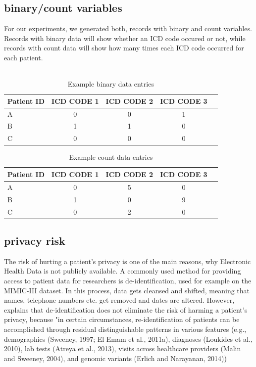 \documentclass[11pt, a4paper]{book}
\begin{document}
\subsection{binary/count variables}
For our experiments, we generated both, records with binary and count variables. Records with binary data will show whether an ICD code occured or not, while records with count data will show how many times each ICD code occurred for each patient.
\\
\\

\begin{table}
\begin{center}
\begin{tabular}{l*{3}{c}r }
Patient ID & ICD CODE 1 & ICD CODE 2 & ICD CODE 3 \\
\hline
A & 0 & 0 & 1 \\
B & 1 & 1 & 0 \\
C & 0 & 0 & 0 \\
\hline
\end{tabular}
\caption{Example binary data entries}
\end{center}
\end{table}


\begin{table}
\begin{center}
\begin{tabular}{l*{3}{c}r }
Patient ID & ICD CODE 1 & ICD CODE 2 & ICD CODE 3 \\
\hline
A & 0 & 5 & 0 \\
B & 1 & 0 & 9 \\
C & 0 & 2 & 0 \\
\hline
\end{tabular}
\caption{Example count data entries}
\end{center}
\end{table}

\subsection{privacy risk}
The risk of hurting a patient's privacy is one of the main reasons, why Electronic Health Data is not publicly available. A commonly used method for providing access to patient data for researchers is de-identification, used for example on the MIMIC-III dataset. In this process, data gets cleansed and shifted, meaning that names, telephone numbers etc. get removed and dates are altered. \cite{johnson2016mimic}
However, \cite{Choi2017} explains that de-identification does not eliminate the risk of harming a patient's privacy, because "in certain circumstances, re-identification of patients can be accomplished through residual distinguishable patterns in various features (e.g., demographics (Sweeney, 1997; El Emam et al., 2011a), diagnoses (Loukides et al., 2010), lab tests (Atreya et al., 2013), visits across healthcare providers (Malin and Sweeney, 2004), and genomic variants (Erlich and Narayanan, 2014)) \cite{Choi2017}
\end{document}
